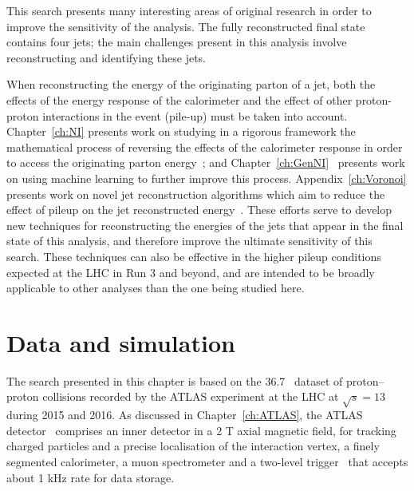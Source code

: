 This search presents many interesting areas of original research in order to improve the sensitivity of the analysis.
The fully reconstructed final state contains four jets;
the main challenges present in this analysis involve reconstructing and identifying these jets.

When reconstructing the energy of the originating parton of a jet, both the effects of the energy response of the calorimeter and the effect of other proton-proton interactions in the event (pile-up) must be taken into account.
Chapter~\ref{ch:NI} presents work on studying in a rigorous framework the mathematical process of reversing the effects of the calorimeter response in order to access the originating parton energy~\cite{Cukierman:2016dkb};
and Chapter~\ref{ch:GenNI}~\cite{ATL-PHYS-PUB-2018-013} presents work on using machine learning to further improve this process.
Appendix~\ref{ch:Voronoi} presents work on novel jet reconstruction algorithms which aim to reduce the effect of pileup on the jet reconstructed energy~\cite{ATLAS-CONF-2017-065}.
These efforts serve to develop new techniques for reconstructing the energies of the jets that appear in the final state of this analysis, and therefore improve the ultimate sensitivity of this search.
These techniques can also be effective in the higher pileup conditions expected at the LHC in Run 3 and beyond, and are intended to be broadly applicable to other analyses than the one being studied here. 

\section{Data and simulation}
The search presented in this chapter is based on the 36.7~\ifb{} dataset of proton--proton collisions
recorded by the ATLAS experiment at the LHC at $\sqrt{s}=13$ \TeV{} during 2015 and 2016.
As discussed in Chapter~\ref{ch:ATLAS}, the ATLAS detector~\cite{PERF-2007-01} comprises an inner detector in a 2 T axial magnetic field, 
for tracking charged particles and a precise localisation of the interaction vertex, 
a finely segmented calorimeter, a muon spectrometer and a two-level trigger~\cite{TRIG-2016-01} that
accepts about 1 kHz rate for data storage.

